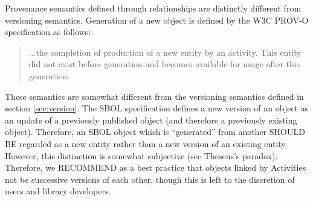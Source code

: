 {Provenance semantics defined through  relationships are distinctly different from versioning semantics. Generation of a new object is defined by the W3C PROV-O specification as follows:
\begin{quote}
...the completion of production of a new entity by an activity. This entity did not exist before generation and becomes available for usage after this generation.
\end{quote}
These semantics are somewhat different from the versioning semantics defined in section \ref{sec:version}. The SBOL specification defines a new version of an object as an update of a previously published object (and therefore a previously existing object). Therefore, an SBOL object which is ``generated'' from another SHOULD BE regarded as a new entity rather than a new version of an existing entity. However, this distinction is somewhat subjective (see Theseus's paradox). Therefore, we RECOMMEND as a best practice that objects linked by Activities not be successive versions of each other, though this is left to the discretion of users and library developers.
} 


